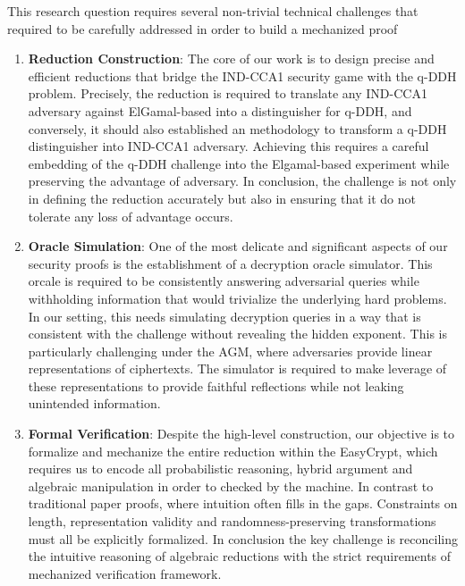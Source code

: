 This research question requires several non-trivial technical challenges that required to be carefully addressed in order to build a mechanized proof

\begin{enumerate}
\item \textbf{Reduction Construction}: The core of our work is to design precise and efficient reductions that bridge the IND-CCA1 security game with the q-DDH problem. Precisely, the reduction is required to translate any IND-CCA1 adversary against ElGamal-based \KEM into a distinguisher for q-DDH, and conversely, it should also established an methodology to transform a q-DDH distinguisher into IND-CCA1 adversary. Achieving this requires a careful embedding of the q-DDH challenge into the Elgamal-based \KEM experiment while preserving the advantage of adversary. 
In conclusion, the challenge is not only in defining the reduction accurately but also in ensuring that it do not tolerate any loss of advantage occurs.

\item \textbf{Oracle Simulation}: One of the most delicate and significant aspects of our security proofs is the establishment of a decryption oracle simulator. This orcale is required to be consistently answering adversarial queries while withholding information that would trivialize the underlying hard problems. In our setting, this needs simulating decryption queries in a way that is consistent with the \qDDH challenge without revealing the hidden exponent. This is particularly challenging under the AGM, where adversaries provide linear representations of ciphertexts. The simulator is required to make leverage of these representations to provide faithful reflections while not leaking unintended information.
\item \textbf{Formal Verification}: Despite the high-level construction, our objective is to formalize and mechanize the entire reduction within the EasyCrypt, which requires us to encode all probabilistic reasoning, hybrid argument and algebraic manipulation in order to checked by the machine. In contrast to traditional paper proofs, where intuition often fills in the gaps. Constraints on length, representation validity and randomness-preserving transformations must all be explicitly formalized. In conclusion the key challenge is reconciling the intuitive reasoning of algebraic reductions with the strict requirements of mechanized verification framework.


\end{enumerate}
